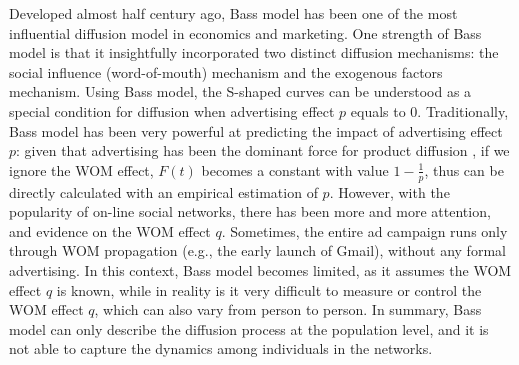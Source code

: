 \documentclass[phd,tocprelim]{cornell}
\begin{document}
Developed almost half century ago, Bass model has been one of the most influential diffusion model in economics and marketing. One strength of Bass model is that it insightfully incorporated two distinct diffusion mechanisms: the social influence (word-of-mouth) mechanism and the exogenous factors mechanism. Using Bass model, the S-shaped curves can be understood as a special condition for diffusion when advertising effect $p$ equals to 0.  Traditionally, Bass model has been very powerful at predicting the impact of advertising effect $p$: given that advertising has been the dominant force for product diffusion , if we ignore the WOM effect, $F(t)$ becomes a constant with value $1-\frac{1}{p}$, thus can be directly calculated with an empirical estimation of $p$. However, with the popularity of on-line social networks, there has been more and more attention, and evidence on the WOM effect $q$. Sometimes, the entire ad campaign runs only through WOM propagation (e.g., the early launch of Gmail), without any formal advertising. In this context, Bass model becomes limited, as it assumes the WOM effect $q$ is known, while in reality is it very difficult to measure or control the WOM effect $q$, which can also vary from person to person. In summary, Bass model can only describe the diffusion process at the population level, and it is not able to capture the dynamics among individuals in the networks.

\end{document}
